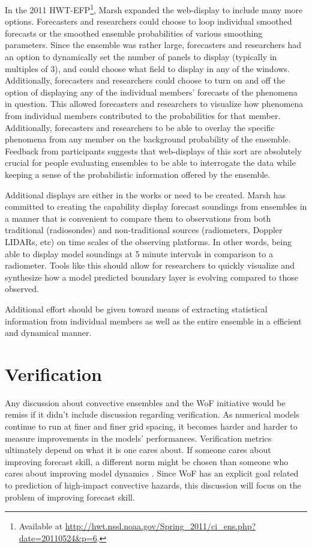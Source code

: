 In the 2011 HWT-EFP\footnote{Available at \url{http://hwt.nssl.noaa.gov/Spring_2011/ci_ens.php?date=20110524&p=6}.}, Marsh expanded the web-display to include many more options. Forecasters and researchers could choose to loop individual smoothed forecasts or the smoothed ensemble probabilities of various smoothing parameters. Since the ensemble was rather large, forecasters and researchers had an option to dynamically set the number of panels to display (typically in multiples of 3), and could choose what field to display in any of the windows. Additionally, forecasters and researchers could choose to turn on and off the option of displaying any of the individual members' forecasts of the phenomena in question. This allowed forecasters and researchers to visualize how phenomena from individual members contributed to the probabilities for that member. Additionally, forecasters and researchers to be able to overlay the specific phenomena from any member on the background probability of the ensemble. Feedback from participants suggests that web-displays of this sort are absolutely crucial for people evaluating ensembles to be able to interrogate the data while keeping a sense of the probabilistic information offered by the ensemble.


Additional displays are either in the works or need to be created. Marsh has committed to creating the capability display forecast soundings from ensembles in a manner that is convenient to compare them to observations from both traditional (radiosondes) and non-traditional sources (radiometers, Doppler LIDARs, etc) on time scales of the observing platforms. In other words, being able to display model soundings at 5 minute intervals in comparison to a radiometer. Tools like this should allow for researchers to quickly visualize and synthesize how a model predicted boundary layer is evolving compared to those observed.


Additional effort should be given toward means of extracting statistical information from individual members as well as the entire ensemble in a efficient and dynamical manner.




\section{Verification}

Any discussion about convective ensembles and the WoF initiative would be remiss if it didn't include discussion regarding verification. As numerical models continue to run at finer and finer grid spacing, it becomes harder and harder to measure improvements in the models' performances. Verification metrics ultimately depend on what it is one cares about. If someone cares about improving forecast skill, a different norm might be chosen than someone who cares about improving model dynamics \citep{hacker2005predictability}. Since WoF has an explicit goal related to prediction of high-impact convective hazards, this discussion will focus on the problem of improving forecast skill.


